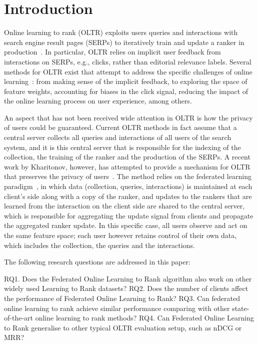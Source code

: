 \section{Introduction}

Online learning to rank (OLTR) exploits users queries and interactions with search engine result pages (SERPs) to iteratively train and update a ranker in  production~\cite{bibid}. In particular, OLTR relies on implicit user feedback from interactions on SERPs, e.g., clicks, rather than editorial relevance labels. 
Several methods for OLTR exist that attempt to address the specific challenges of online learning~\cite{bibid}: from making sense of the implicit feedback, to exploring the space of feature weights, accounting for biases in the click signal, reducing the impact of the online learning process on user experience, among others. 

An aspect that has not been received wide attention in OLTR is how the privacy of users could be guaranteed. Current OLTR methods in fact assume that a central server collects all queries and interactions of all users of the search system, and it is this central server that is responsible for the indexing of the collection, the training of the ranker and the production of the SERPs. A recent work by Kharitonov, however, has attempted to provide a mechanism for OLTR that preserves the privacy of users~\cite{kharitonov2019federated}. The method relies on the federated learning paradigm~\cite{bibid}, in which data (collection, queries, interactions) is maintained at each client's side along with a copy of the ranker, and updates to the rankers that are learned from the interaction on the client side are shared to the central server, which is responsible for aggregating the update signal from clients and propagate the aggregated ranker update. In this specific case, all users observe and act on the same feature space; each user however retains control of their own data, which includes the collection, the queries and the interactions.  





The following research questions are addressed in this paper:

RQ1. Does the Federated Online Learning to Rank algorithm also work on other widely used Learning to Rank datasets?
RQ2. Does the number of clients affect the performance of Federated Online Learning to Rank?
RQ3. Can federated online learning to rank achieve similar performance comparing with other state-of-the-art online learning to rank methods?
RQ4. Can Federated Online Learning to Rank generalise to other typical OLTR evaluation setup, such as nDCG or MRR?
